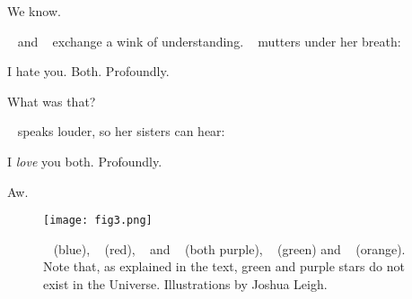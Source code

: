 \documentclass[main.tex]{subfiles}
\begin{document}
\par \Taygete We know. 

\par \nar \rmtaygete~ and \rmalcyone~ exchange a wink of understanding.  \rmcelaeno~ mutters under her breath:

\par \Celaeno I hate you.  Both.  Profoundly.

\par \Taygete What was that?

\par \nar \rmcelaeno~ speaks louder, so her sisters can hear:

\par \Celaeno I \textit{love} you both.  Profoundly.

\par \Alcyone Aw.

\begin{figure}
\texttt{[image: fig3.png]}
\caption{\rmmaia~ (blue), \rmelectra~ (red), \rmtaygete~ and \rmalcyone~ (both purple), \rmcelaeno~ (green) and \rmsterope~ (orange).  Note that, as explained in the text, green and purple stars do not exist in the Universe.  Illustrations by Joshua Leigh.
\label{fig:fig3}}
\end{figure}
\end{document}
